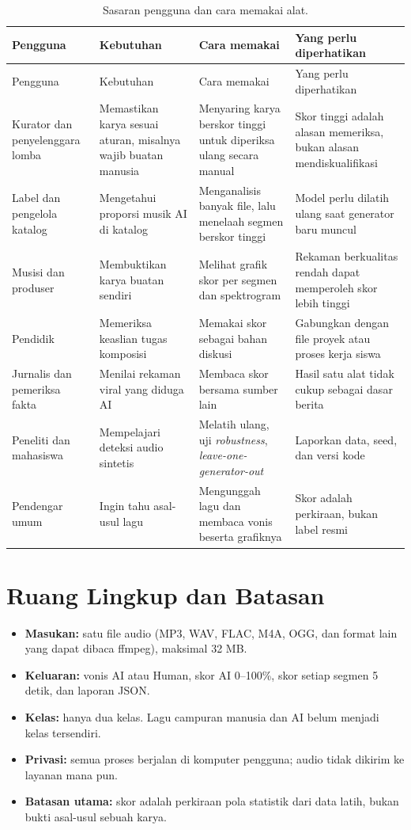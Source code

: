 {\singlespacing\small
\begin{longtable}{L{2.4cm} L{3.2cm} L{3.2cm} L{3.2cm}}
\caption{Sasaran pengguna dan cara memakai alat.}\label{tab:pengguna}\\
\toprule
Pengguna & Kebutuhan & Cara memakai & Yang perlu diperhatikan\\
\midrule
\endfirsthead
\toprule
Pengguna & Kebutuhan & Cara memakai & Yang perlu diperhatikan\\
\midrule
\endhead
\bottomrule
\endfoot
Kurator dan penyelenggara lomba & Memastikan karya sesuai aturan, misalnya wajib buatan manusia & Menyaring karya berskor tinggi untuk diperiksa ulang secara manual & Skor tinggi adalah alasan memeriksa, bukan alasan mendiskualifikasi\\
Label dan pengelola katalog & Mengetahui proporsi musik AI di katalog & Menganalisis banyak file, lalu menelaah segmen berskor tinggi & Model perlu dilatih ulang saat generator baru muncul\\
Musisi dan produser & Membuktikan karya buatan sendiri & Melihat grafik skor per segmen dan spektrogram & Rekaman berkualitas rendah dapat memperoleh skor lebih tinggi\\
Pendidik & Memeriksa keaslian tugas komposisi & Memakai skor sebagai bahan diskusi & Gabungkan dengan file proyek atau proses kerja siswa\\
Jurnalis dan pemeriksa fakta & Menilai rekaman viral yang diduga AI & Membaca skor bersama sumber lain & Hasil satu alat tidak cukup sebagai dasar berita\\
Peneliti dan mahasiswa & Mempelajari deteksi audio sintetis & Melatih ulang, uji \textit{robustness}, \textit{leave-one-generator-out} & Laporkan data, seed, dan versi kode\\
Pendengar umum & Ingin tahu asal-usul lagu & Mengunggah lagu dan membaca vonis beserta grafiknya & Skor adalah perkiraan, bukan label resmi\\
\end{longtable}}

\section{Ruang Lingkup dan Batasan}
\begin{itemize}
\item \textbf{Masukan:} satu file audio (MP3, WAV, FLAC, M4A, OGG, dan format lain yang dapat dibaca ffmpeg), maksimal 32 MB.
\item \textbf{Keluaran:} vonis AI atau Human, skor AI 0--100\%, skor setiap segmen 5 detik, dan laporan JSON.
\item \textbf{Kelas:} hanya dua kelas. Lagu campuran manusia dan AI belum menjadi kelas tersendiri.
\item \textbf{Privasi:} semua proses berjalan di komputer pengguna; audio tidak dikirim ke layanan mana pun.
\item \textbf{Batasan utama:} skor adalah perkiraan pola statistik dari data latih, bukan bukti asal-usul sebuah karya.
\end{itemize}

